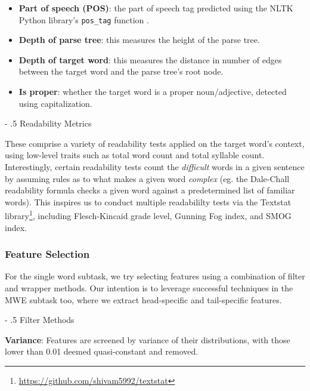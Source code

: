 \documentclass[11pt,a4paper]{article}
\makeatletter
\renewcommand\paragraph{%
    \@startsection{paragraph}{4}{0mm}%
        {-\baselineskip}%
        {.5\baselineskip}%
        {\normalfont\normalsize\bfseries}}
\makeatother
\begin{document}
\begin{itemize}
  \item \textbf{Part of speech (POS)}: the part of speech tag predicted using the NLTK Python library's \texttt{pos\_tag} function \citep{Loper02nltk:the}.
  \item \textbf{Depth of parse tree}: this measures the height of the parse tree.
  \item \textbf{Depth of target word}: this measures the distance in number of edges between the target word and the parse tree's root node.
  \item \textbf{Is proper}: whether the target word is a proper noun/adjective, detected using capitalization.
\end{itemize}

\paragraph{Readability Metrics}

These comprise a variety of readability tests applied on the target word's context, using low-level traits such as total word count and total syllable count. Interestingly, certain readability tests count the \textit{difficult} words in a given sentence by assuming rules as to what makes a given word \textit{complex} (eg. the Dale-Chall readability formula \citep{10.2307/1473169} checks a given word against a predetermined list of familiar words). This inspires us to conduct multiple readabililty tests via the Textstat library\footnote{\url{https://github.com/shivam5992/textstat}}, including Flesch-Kincaid grade level, Gunning Fog index, and SMOG index.

\subsubsection{Feature Selection}

For the single word subtask, we try selecting features using a combination of filter and wrapper methods. Our intention is to leverage successful techniques in the MWE subtask too, where we extract head-specific and tail-specific features.

\paragraph{Filter Methods}

\textbf{Variance}: Features are screened by variance of their distributions, with those lower than 0.01 deemed quasi-constant and removed. 
\end{document}
